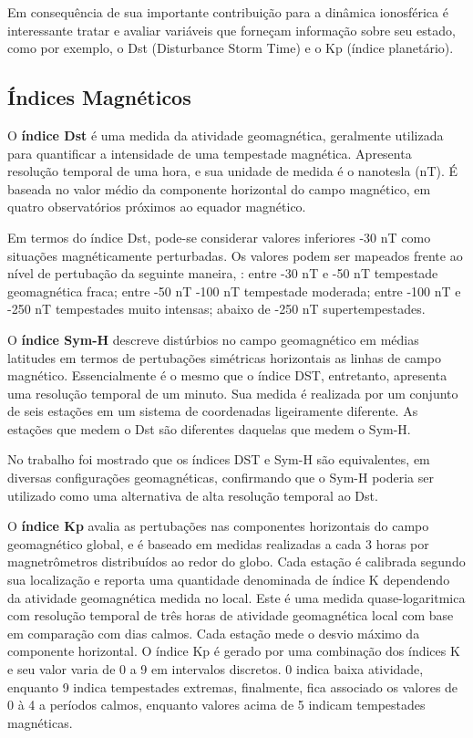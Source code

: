 Em consequência de sua importante contribuição para a dinâmica ionosférica é interessante tratar e avaliar variáveis que forneçam informação sobre seu estado, como por exemplo, o Dst (Disturbance Storm Time) e o Kp (índice planetário).

\subsection{Índices Magnéticos}

O {\bf índice Dst} é uma medida da atividade geomagnética, geralmente utilizada para quantificar a intensidade de uma tempestade magnética. Apresenta resolução temporal de uma hora, e sua unidade de medida é o nanotesla (nT). É baseada no valor médio da componente horizontal do campo magnético, em quatro observatórios próximos ao equador magnético.

Em termos do índice Dst, pode-se considerar valores inferiores -30 nT como situações magnéticamente perturbadas. Os valores podem ser mapeados frente ao nível de pertubação da seguinte maneira, \cite{GONZALEZ:1994}: entre -30 nT e -50 nT tempestade geomagnética fraca; entre -50 nT -100 nT tempestade moderada; entre -100 nT e -250 nT tempestades muito intensas; abaixo de -250 nT supertempestades.

O {\bf índice Sym-H} descreve distúrbios no campo geomagnético em médias latitudes em termos de pertubações simétricas horizontais as linhas de campo magnético. Essencialmente é o mesmo que o índice DST, entretanto, apresenta uma resolução temporal de um minuto. Sua medida é realizada por um conjunto de seis estações em um sistema de coordenadas ligeiramente diferente. As estações que medem o Dst são diferentes daquelas que medem o Sym-H.

No trabalho \cite{WANLISS:2006} foi mostrado que os índices DST e Sym-H são equivalentes, em diversas configurações geomagnéticas, confirmando que o Sym-H poderia ser utilizado como uma alternativa de alta resolução temporal ao Dst.

O {\bf índice Kp} avalia as pertubações nas componentes horizontais do campo geomagnético global, e é baseado em medidas realizadas a cada 3 horas por magnetrômetros distribuídos ao redor do globo. Cada estação é calibrada segundo sua localização e reporta uma quantidade denominada de índice K dependendo da atividade geomagnética medida no local. Este é uma medida quase-logaritmica com resolução temporal de três horas de atividade geomagnética local com base em comparação com dias calmos. Cada estação mede o desvio máximo da componente horizontal. O índice Kp é gerado por uma combinação dos índices K e seu valor varia de 0 a 9 em intervalos discretos. 0 indica baixa atividade, enquanto 9 indica tempestades extremas, finalmente, fica associado os valores de 0 à 4 a períodos calmos, enquanto valores acima de 5 indicam tempestades magnéticas.

